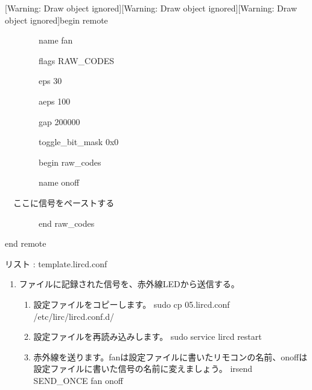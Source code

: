 \documentclass[a4paper,dvipdfmx]{jarticle}
\newcounter{List}
\renewcommand\theList{\arabic{List}}
\begin{document}
\centering
\begin{minipage}{17.006cm}
[Warning: Draw object ignored][Warning: Draw object ignored][Warning: Draw object ignored]begin remote


\bigskip

\ \ \ \ \ \ \ \ name \textcolor[rgb]{1.0,0.2,0.2}{fan}

\ \ \ \ \ \ \ \ flags RAW\_CODES

\ \ \ \ \ \ \ \ eps 30

\ \ \ \ \ \ \ \ aeps 100


\bigskip

\ \ \ \ \ \ \ \ gap 200000

\ \ \ \ \ \ \ \ toggle\_bit\_mask 0x0


\bigskip

\ \ \ \ \ \ \ \ begin raw\_codes

\ \ \ \ \ \ \ \ name \textcolor[rgb]{1.0,0.2,0.2}{onoff}

\textcolor[rgb]{0.5019608,0.5019608,0.5019608}{\ \ }\textcolor[rgb]{1.0,0.2,0.2}{ここに信号をペーストする}

\ \ \ \ \ \ \ \ end raw\_codes


\bigskip

end remote

{\mdseries
リスト {\theList\label{seq:refList8}}: template.lircd.conf}
\end{minipage}
\begin{enumerate}
\item \clearpage
ファイルに記録された信号を、赤外線LEDから送信する。

\begin{enumerate}
\item 設定ファイルをコピーします。\newline
sudo cp 05.lircd.conf /etc/lirc/lircd.conf.d/
\item
設定ファイルを再読み込みします。\newline
sudo service lircd restart
\item
赤外線を送ります。fanは設定ファイルに書いたリモコンの名前、onoffは設定ファイルに書いた信号の名前に変えましょう。\newline
irsend SEND\_ONCE \textcolor[rgb]{1.0,0.2,0.2}{fan} \textcolor[rgb]{1.0,0.2,0.2}{onoff}
\end{enumerate}
\end{enumerate}
\end{document}
